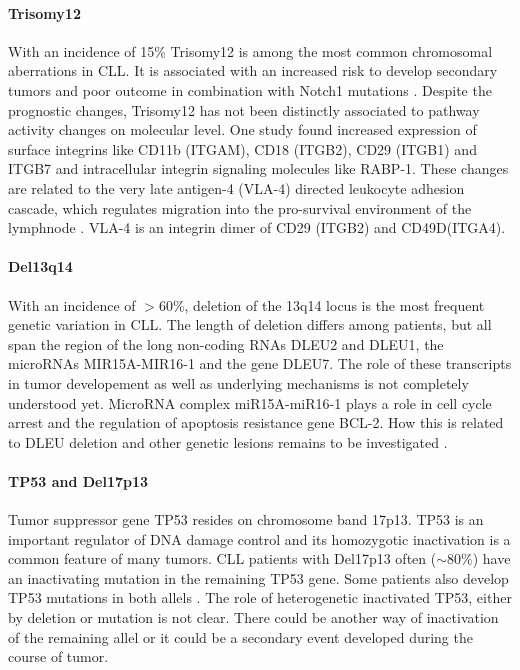 \paragraph{Trisomy12}
With an incidence of 15\% Trisomy12 is among the most common chromosomal aberrations in CLL. It is associated with an increased risk to develop secondary tumors and poor outcome in combination with Notch1 mutations \citep{Fabbri2016}. Despite the prognostic changes, Trisomy12 has not been distinctly associated to pathway activity changes on molecular level. One study found increased expression of surface integrins like CD11b (ITGAM), CD18 (ITGB2), CD29 (ITGB1) and ITGB7 and intracellular integrin signaling molecules like RABP-1. These changes are related to the very late antigen-4 (VLA-4) directed leukocyte adhesion cascade, which regulates migration into the pro-survival environment of the lymphnode \citep{Riches2014}. VLA-4 is an integrin dimer of CD29 (ITGB2) and CD49D(ITGA4).

\paragraph{Del13q14}
With an incidence of $>60$\%, deletion of the 13q14 locus is the most frequent genetic variation in CLL. The length of deletion differs among patients, but all span the region of the long non-coding RNAs DLEU2 and DLEU1, the microRNAs MIR15A-MIR16-1 and the gene DLEU7. The role of these transcripts in tumor developement as well as underlying mechanisms is not completely understood yet. MicroRNA complex miR15A-miR16-1 plays a role in cell cycle arrest and the regulation of apoptosis resistance gene BCL-2. How this is related to DLEU deletion and other genetic lesions remains to be investigated \citep{Aqeilan2009}.
 
\paragraph{TP53 and Del17p13} 
Tumor suppressor gene TP53 resides on chromosome band 17p13. TP53 is an important regulator of DNA damage control and its homozygotic inactivation is a common feature of many tumors. CLL patients with Del17p13 often ($\sim80\%$) have an inactivating mutation in the remaining TP53 gene. Some patients also develop TP53 mutations in both allels \citep{Fabbri2016}. The role of heterogenetic inactivated TP53, either by deletion or mutation is not clear. There could be another way of inactivation of the remaining allel or it could be a secondary event developed during the course of tumor.

